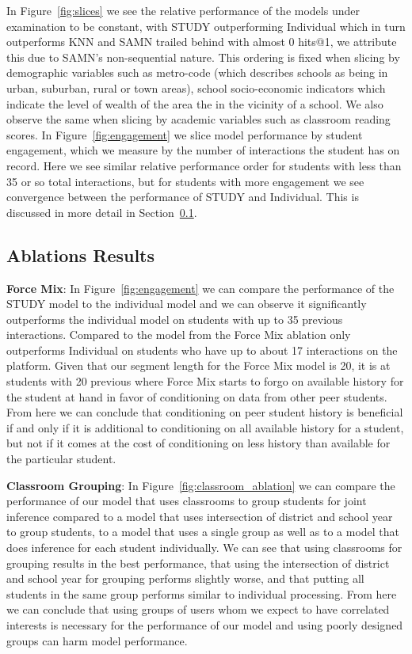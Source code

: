 \documentclass{article}
\begin{document}
In Figure~\ref{fig:slices} we see the relative performance of the models under examination to be constant, with STUDY outperforming Individual which in turn outperforms KNN and SAMN trailed behind with almost 0 hits@1, we attribute this due to SAMN's non-sequential nature. This ordering is fixed when slicing by demographic variables such as metro-code (which describes schools as being in urban, suburban, rural or town areas), school socio-economic indicators which indicate the level of wealth of the area the in the vicinity of a school. We also observe the same when slicing by academic variables such as classroom reading scores. In Figure~\ref{fig:engagement} we slice model performance by student engagement, which we measure by the number of interactions the student has on record. Here we see similar relative performance order for students with less than 35 or so total interactions, but for students with more engagement we see convergence between the performance of STUDY and Individual. This is discussed in more detail in Section~\ref{section:ablation_results}.

\subsection{Ablations Results}
\label{section:ablation_results}

\textbf{Force Mix}: In Figure~\ref{fig:engagement} we can compare the performance of the STUDY model to the individual model and we can observe it significantly outperforms the individual model on students with up to 35 previous interactions. Compared to the model from the Force Mix ablation only outperforms Individual on students who have up to about 17 interactions on the platform. Given that our segment length for the Force Mix model is 20, it is at students with 20 previous where Force Mix starts to forgo on available history for the student at hand in favor of conditioning on data from other peer students. From here we can conclude that conditioning on peer student history is beneficial if and only if it is additional to conditioning on all available history for a student, but not if it comes at the cost of conditioning on less history than available for the particular student.

\textbf{Classroom Grouping}: In Figure~\ref{fig:classroom_ablation} we can compare the performance of our model that uses classrooms to group students for joint inference compared to a model that uses intersection of district and school year to group students, to a model that uses a single group as well as to a model that does inference for each student individually. We can see that using classrooms for grouping results in the best performance, that using the intersection of district and school year for grouping performs slightly worse, and that putting all students in the same group performs similar to individual processing. From here we can conclude that using groups of users whom we expect to have correlated interests is necessary for the performance of our model and using poorly designed groups can harm model performance.
\end{document}
